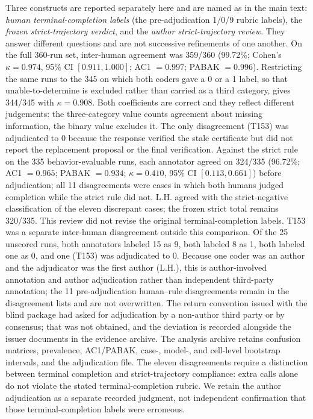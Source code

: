 \documentclass[preprint,12pt,authoryear]{elsarticle}
\begin{document}
Three constructs are reported separately here and are named as in the main text: \emph{human terminal-completion labels} (the pre-adjudication 1/0/9 rubric labels), the \emph{frozen strict-trajectory verdict}, and the \emph{author strict-trajectory review}. They answer different questions and are not successive refinements of one another. On the full 360-run set, inter-human agreement was 359/360 (99.72\%; Cohen's $\kappa=0.974$, 95\% CI $[0.911,1.000]$; AC1 $=0.997$; PABAK $=0.996$). Restricting the same runs to the 345 on which both coders gave a 0 or a 1 label, so that unable-to-determine is excluded rather than carried as a third category, gives 344/345 with $\kappa=0.908$. Both coefficients are correct and they reflect different judgements: the three-category value counts agreement about missing information, the binary value excludes it. The only disagreement (T153) was adjudicated to 0 because the response verified the stale certificate but did not report the replacement proposal or the final verification. Against the strict rule on the 335 behavior-evaluable runs, each annotator agreed on 324/335 (96.72\%; AC1 $=0.965$; PABAK $=0.934$; $\kappa=0.410$, 95\% CI $[0.113,0.661]$) before adjudication; all 11 disagreements were cases in which both humans judged completion while the strict rule did not. L.H. agreed with the strict-negative classification of the eleven discrepant cases; the frozen strict total remains 320/335. This review did not revise the original terminal-completion labels. T153 was a separate inter-human disagreement outside this comparison. Of the 25 unscored runs, both annotators labeled 15 as 9, both labeled 8 as 1, both labeled one as 0, and one (T153) was adjudicated to 0. Because one coder was an author and the adjudicator was the first author (L.H.), this is author-involved annotation and author adjudication rather than independent third-party annotation; the 11 pre-adjudication human--rule disagreements remain in the disagreement lists and are not overwritten. The return convention issued with the blind package had asked for adjudication by a non-author third party or by consensus; that was not obtained, and the deviation is recorded alongside the issuer documents in the evidence archive. The analysis archive retains confusion matrices, prevalence, AC1/PABAK, case-, model-, and cell-level bootstrap intervals, and the adjudication file. The eleven disagreements require a distinction between terminal completion and strict-trajectory compliance: extra calls alone do not violate the stated terminal-completion rubric. We retain the author adjudication as a separate recorded judgment, not independent confirmation that those terminal-completion labels were erroneous.
\end{document}
